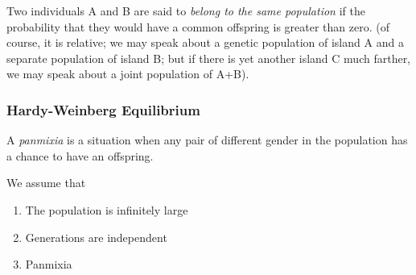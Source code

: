 \documentclass[main.tex]{subfiles}
\begin{document}
Two individuals A and B are said to \emph{belong to the same population} if the probability that they would have a common offspring is greater than zero.
(of course, it is relative; we may speak about a genetic population of island A and a separate population of island B; but if there is yet another island C much farther, we may speak about a joint population of A+B).

\subsubsection{Hardy-Weinberg Equilibrium}

A \emph{panmixia} is a situation when any pair of different gender in the population has a chance to have an offspring.

We assume that
\begin{enumerate}[noitemsep]
    \item The population is infinitely large
    \item Generations are independent
    \item Panmixia
\end{enumerate}
\end{document}
